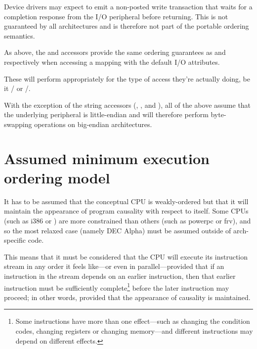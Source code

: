 \begin{description}[style=nextline]
	Device drivers may expect  to emit a non-posted write
	transaction that waits for a completion response from the I/O
	peripheral before returning.
	This is not guaranteed by all architectures and is therefore not
	part of the portable ordering semantics.

 \item[\tco{insX()}, \tco{outsX()}:]

	As above, the  and  accessors provide the same
	ordering guarantees as  and  respectively
	when accessing a mapping with the default I/O attributes.

 \item[\tco{ioreadX()}, \tco{iowriteX()}:]

	These will perform appropriately for the type of access they're actually
	doing, be it / or /.
\end{description}

With the exception of the string accessors (, ,
 and ), all of the above assume that the underlying
peripheral is little-endian and will therefore perform byte-swapping
operations on big-endian architectures.


\section{Assumed minimum execution ordering model}

It has to be assumed that the conceptual CPU is weakly-ordered but that it will
maintain the appearance of program causality with respect to itself.
Some CPUs (such as i386 or ) are more constrained than others
(such as powerpc or frv), and so the most relaxed case (namely DEC Alpha)
must be assumed outside of arch-specific code.

This means that it must be considered that the CPU will execute its instruction
stream in any order it feels like---or even in parallel---provided that if an
instruction in the stream depends on an earlier instruction, then that
earlier instruction must be sufficiently complete\footnote{
	Some instructions have more than one effect---such as changing the
	condition codes, changing registers or changing memory---and
	different instructions may depend on different effects.}
before the later instruction may proceed; in other words, provided that the
appearance of causality is maintained.

